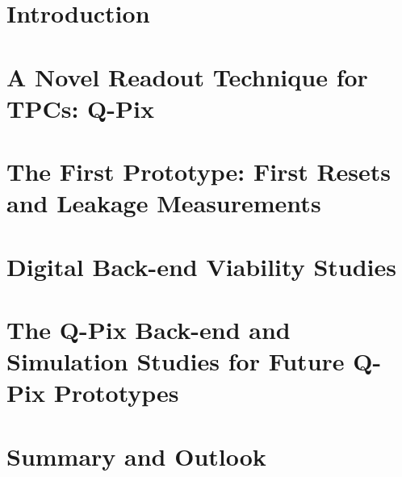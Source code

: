 \documentclass[12pt]{uh_thesis}
\begin{document}
\chapter{Introduction}
\label{chap:intro}


\chapter{A Novel Readout Technique for TPCs: Q-Pix}
\label{chap:qpix}


\chapter{The First Prototype: First Resets and Leakage Measurements}
\label{chap:saq}


\chapter{Digital Back-end Viability Studies}
\label{chap:qdb}


\chapter{The Q-Pix Back-end and Simulation Studies for Future Q-Pix Prototypes}
\label{chap:sim}


\chapter{Summary and Outlook}
\label{chap:summary}


\printbibliography[heading=bibintoc]

\appendix

% 

% 
\end{document}
